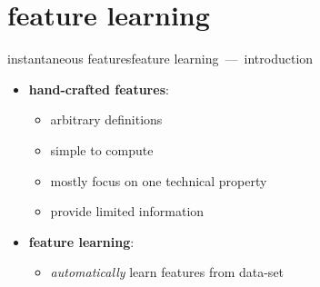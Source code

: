     \section[learned]{feature learning}
        \begin{frame}{instantaneous features}{feature learning~---~introduction}
            \begin{itemize}
                \item   \textbf{hand-crafted features}:
                    \begin{itemize}
                        \item   arbitrary definitions
                        \item   simple to compute
                        \item   mostly focus on one technical property
                        \item   provide limited information
                    \end{itemize}
                    
                \bigskip
                \item<2-> \textbf{feature learning}:
                    \begin{itemize}
                        \item   \textit{automatically} learn features from data-set
                    \end{itemize}
            \end{itemize}
		\end{frame}
